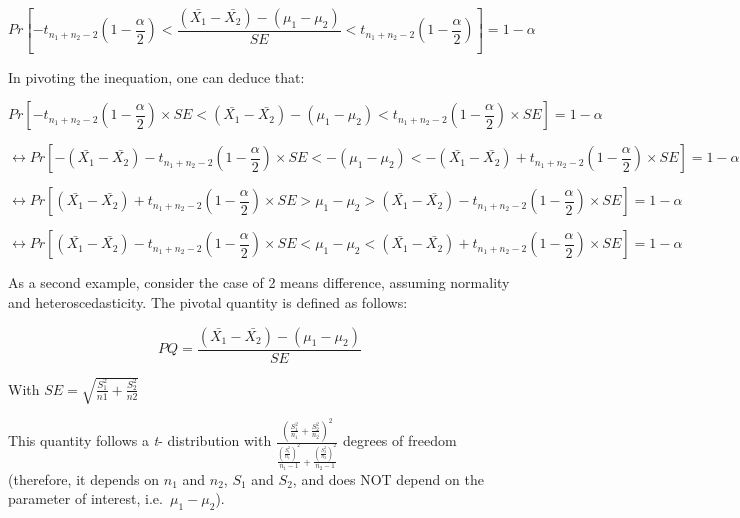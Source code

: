 \documentclass[man,floatsintext]{apa6}
\begin{document}
\begin{equation} 
Pr[-t_{n_1+n_2-2}(1-\frac{\alpha}{2}) < \frac{(\bar{X_1}-\bar{X_2})-(\mu_1-\mu_2)}{SE} < t_{n_1+n_2-2}(1-\frac{\alpha}{2})] = 1 - \alpha
\label{eq:conflev2}
\end{equation}

In pivoting the inequation, one can deduce that:

\begin{equation} 
Pr[-t_{n_1+n_2-2}(1-\frac{\alpha}{2}) \times SE < (\bar{X_1}-\bar{X_2})-(\mu_1-\mu_2) < t_{n_1+n_2-2}(1-\frac{\alpha}{2}) \times SE] = 1-\alpha
\label{eq:conflev3}
\end{equation}

\begin{equation} 
\leftrightarrow Pr[-(\bar{X_1}-\bar{X_2}) -t_{n_1+n_2-2}(1-\frac{\alpha}{2}) \times SE <
-(\mu_1-\mu_2) 
< -(\bar{X_1}-\bar{X_2}) +t_{n_1+n_2-2}(1-\frac{\alpha}{2}) \times SE]= 1- \alpha
\label{eq:conflev4}
\end{equation}

\begin{equation} 
\leftrightarrow Pr[(\bar{X_1}-\bar{X_2}) +t_{n_1+n_2-2}(1-\frac{\alpha}{2}) \times SE > \mu_1-\mu_2 > (\bar{X_1}-\bar{X_2}) - t_{n_1+n_2-2}(1-\frac{\alpha}{2}) \times SE]= 1- \alpha
\label{eq:conflev5}
\end{equation}

\begin{equation} 
\leftrightarrow Pr[(\bar{X_1}-\bar{X_2}) - t_{n_1+n_2-2}(1-\frac{\alpha}{2}) \times SE < \mu_1-\mu_2 <(\bar{X_1}-\bar{X_2}) +t_{n_1+n_2-2}(1-\frac{\alpha}{2}) \times SE]= 1- \alpha
\label{eq:conflev6}
\end{equation}

As a second example, consider the case of 2 means difference, assuming normality and heteroscedasticity. The pivotal quantity is defined as follows:

\begin{equation} 
PQ= \frac{(\bar{X_1}-\bar{X_2})-(\mu_1-\mu_2)}{SE}
\label{eq:PQwelch}
\end{equation}

With \(SE = \sqrt{\frac{S^2_1}{n1}+\frac{S^2_2}{n2}}\)

This quantity follows a \emph{t}- distribution with \(\frac{(\frac{S^2_1}{n_1}+\frac{S^2_2}{n_2})^2}{\frac{(\frac{S^2_1}{n_1})^2}{n_1-1}+\frac{(\frac{S^2_2}{n_2})^2}{n_2-1}}\) degrees of freedom (therefore, it depends on \(n_1\) and \(n_2\), \(S_1\) and \(S_2\), and does NOT depend on the parameter of interest, i.e.~\(\mu_1-\mu_2\)).
\end{document}
